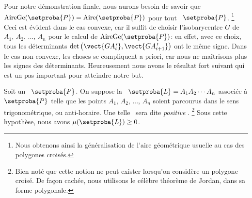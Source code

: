     


Pour notre démonstration finale, nous aurons besoin de savoir que $\garea{\setproba{P}} = \area{\setproba{P}}$ pour tout \ngone\ $\setproba{P}$.%
\footnote{
	Nous obtenons ainsi la généralisation de l'aire géométrique usuelle au cas des polygones croisés.
}
Ceci est évident dans le cas convexe, car il suffit de choisir l'isobarycentre $G$ de $A_1$, $A_2$, ..., $A_n$ pour le calcul de $\garea{\setproba{P}}$: en effet, avec ce choix, tous les déterminants $\det \big( \vect{G A^{\,\prime}_i} , \vect{G A^{\,\prime}_{i+1}} \big)$ ont le même signe.
Dans le cas non-convexe, les choses se compliquent a priori, car nous ne maîtrisons plus les signes des déterminants. Heureusement nous avons le résultat fort suivant qui est un pas important pour atteindre notre but.


\begin{fact} \label{route-direction}
    Soit un \ngone\ $\setproba{P}$.
    On suppose la \nline\ $\setproba{L} = A_1 A_2 \cdots A_n$ associée à $\setproba{P}$ telle que les points $A_1$, $A_2$, ..., $A_n$ soient parcourus dans le sens trigonométrique, ou anti-horaire. Une telle \nline\ sera dite \og \emph{positive} \fg.%
    \footnote{
    	Bien noté que cette notion ne peut exister lorsqu'on considère un polygone croisé. De façon cachée, nous utilisons le célèbre théorème de Jordan, dans sa forme polygonale. 
    }
    Sous cette hypothèse, nous avons $\mu(\setproba{L}) \geq 0$.
\end{fact}


